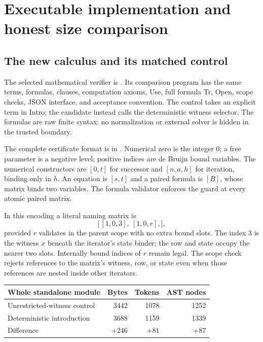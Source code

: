 \section{Executable implementation and honest size comparison}

\subsection{The new calculus and its matched control}

The selected mathematical verifier is . Its comparison
program  has the same terms, formulas, clauses,
computation axioms, Use, full formula Tr, Open, scope checks, JSON interface,
and acceptance convention. The control takes an explicit term in Intro;
the candidate instead calls the deterministic witness selector. The formulas
are raw finite syntax: no normalization or external solver is hidden in the
trusted boundary.

The complete certificate format is in . Numerical zero
is the integer $0$; a free parameter is a negative level; positive indices
are de Bruijn bound variables. The numerical constructors are $[0,t]$ for
successor and $[n,a,h]$ for iteration, binding only in $h$. An equation is
$[s,t]$ and a paired formula is $[B]$, whose matrix binds two variables.
The formula validator enforces the guard at every atomic paired matrix.

In this encoding a literal naming matrix is
\[
 \bigl[\,[1,0,3],\ [1,0,r],\bigr],
\]
provided $r$ validates in the parent scope with no extra bound slots. The
index $3$ is the witness $x$ beneath the iterator's state binder; the row
and state occupy the nearer two slots. Internally bound indices of $r$
remain legal. The scope check rejects references to the matrix's witness,
row, or state even when those references are nested inside other iterators.

\begin{center}
\begin{tabular}{lrrr}\toprule
Whole standalone module & Bytes & Tokens & AST nodes\\\midrule
Unrestricted-witness control & 3442 & 1078 & 1252\\
Deterministic introduction & 3688 & 1159 & 1339\\
Difference & $+246$ & $+81$ & $+87$\\\bottomrule
\end{tabular}
\end{center}

